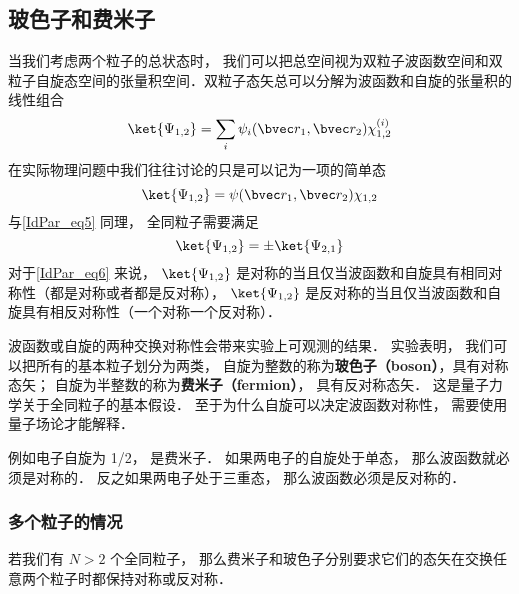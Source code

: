 \subsection{玻色子和费米子}
当我们考虑两个粒子的总状态时， 我们可以把总空间视为双粒子波函数空间和双粒子自旋态空间的张量积空间．双粒子态矢总可以分解为波函数和自旋的张量积的线性组合 %
\begin{equation}
\ket{\Psi_{1,2}} = \sum_i \psi_i(\bvec r_1, \bvec r_2) \chi^{(i)}_{1,2}
\end{equation}
在实际物理问题中我们往往讨论的只是可以记为一项的简单态
\begin{equation}\label{IdPar_eq6}
\ket{\Psi_{1,2}} = \psi(\bvec r_1, \bvec r_2) \chi_{1,2}
\end{equation}
与\autoref{IdPar_eq5} 同理， 全同粒子需要满足
\begin{equation}
\ket{\Psi_{1,2}} = \pm \ket{\Psi_{2,1}}
\end{equation}
对于\autoref{IdPar_eq6} 来说， $\ket{\Psi_{1,2}}$ 是对称的当且仅当波函数和自旋具有相同对称性（都是对称或者都是反对称）， $\ket{\Psi_{1,2}}$ 是反对称的当且仅当波函数和自旋具有相反对称性（一个对称一个反对称）．

波函数或自旋的两种交换对称性会带来实验上可观测的结果． 实验表明， 我们可以把所有的基本粒子划分为两类， 自旋为整数的称为\textbf{玻色子（boson）}，具有对称态矢； 自旋为半整数的称为\textbf{费米子（fermion）}， 具有反对称态矢． 这是量子力学关于全同粒子的基本假设． 至于为什么自旋可以决定波函数对称性， 需要使用量子场论才能解释． %

例如电子自旋为 1/2， 是费米子． 如果两电子的自旋处于单态， 那么波函数就必须是对称的． 反之如果两电子处于三重态， 那么波函数必须是反对称的．

\subsubsection{多个粒子的情况}
若我们有 $N > 2$ 个全同粒子， 那么费米子和玻色子分别要求它们的态矢在交换任意两个粒子时都保持对称或反对称．

